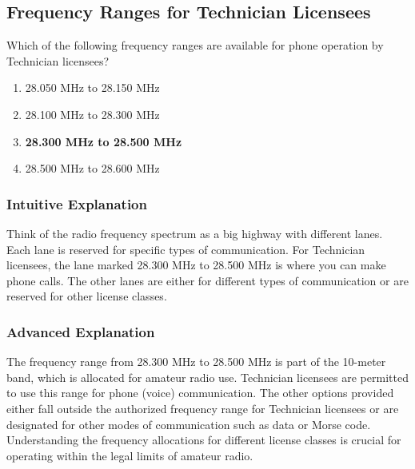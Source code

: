 \subsection{Frequency Ranges for Technician Licensees}
\label{T1B01}

\begin{tcolorbox}[colback=gray!10!white,colframe=black!75!black,title=T1B01]
Which of the following frequency ranges are available for phone operation by Technician licensees?
\begin{enumerate}[label=\Alph*,noitemsep]
    \item 28.050 MHz to 28.150 MHz
    \item 28.100 MHz to 28.300 MHz
    \item \textbf{28.300 MHz to 28.500 MHz}
    \item 28.500 MHz to 28.600 MHz
\end{enumerate}
\end{tcolorbox}

\subsubsection*{Intuitive Explanation}
Think of the radio frequency spectrum as a big highway with different lanes. Each lane is reserved for specific types of communication. For Technician licensees, the lane marked 28.300 MHz to 28.500 MHz is where you can make phone calls. The other lanes are either for different types of communication or are reserved for other license classes.

\subsubsection*{Advanced Explanation}
The frequency range from 28.300 MHz to 28.500 MHz is part of the 10-meter band, which is allocated for amateur radio use. Technician licensees are permitted to use this range for phone (voice) communication. The other options provided either fall outside the authorized frequency range for Technician licensees or are designated for other modes of communication such as data or Morse code. Understanding the frequency allocations for different license classes is crucial for operating within the legal limits of amateur radio.